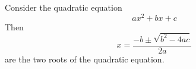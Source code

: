 \documentclass{article}
\begin{document}
  Consider the quadratic equation
  \begin{equation}
    a x^2 + b x + c
  \end{equation}
  Then 
  \begin{equation}
    \label{eq:quad}
    x = \frac{-b\pm\sqrt{b^2-4ac}}{2a}
  \end{equation}
  are the two roots of the quadratic equation.
\end{document}
